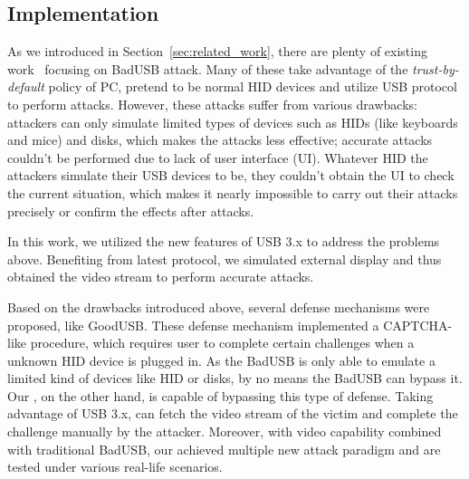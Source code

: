 \subsection{Implementation}
As we introduced in Section~\ref{sec:related_work}, there are plenty of existing work~\cite{rubber,badusb, rubberducky2020, usbbypassing, iseeyou, usbdriver} focusing on BadUSB attack. 
Many of these take advantage of the \textit{trust-by-default} policy of PC, pretend to be normal HID devices and utilize USB protocol to perform attacks. 
However, these attacks suffer from various drawbacks:
 attackers can only simulate limited types of devices such as HIDs (like keyboards and mice) and disks, which makes the attacks less effective;
 accurate attacks couldn't be performed due to lack of user interface (UI).
Whatever HID the attackers simulate their USB devices to be, they couldn't obtain the UI to check the current situation, which makes it nearly impossible to carry out their attacks precisely or confirm the effects after attacks.

In this work, we utilized the new features of USB 3.x \cite{usb31} \cite{usb32} to address the problems above.
Benefiting from latest protocol, we simulated external display and thus obtained the video stream to perform accurate attacks.

Based on the drawbacks introduced above, several defense mechanisms were proposed, like GoodUSB\cite{tian2015defending}. These defense mechanism implemented a CAPTCHA-like\cite{captcha} procedure, which requires user to complete certain challenges when a unknown HID device is plugged in. As the BadUSB is only able to emulate a limited kind of devices like HID or disks, by no means the BadUSB can bypass it. Our \tool, on the other hand, is capable of bypassing this type of defense. Taking advantage of USB 3.x\cite{usb31}\cite{usb32}, \tool can fetch the video stream of the victim and complete the challenge manually by the attacker. Moreover, with video capability combined with traditional BadUSB, our \tool achieved multiple new attack paradigm and are tested under various real-life scenarios.


